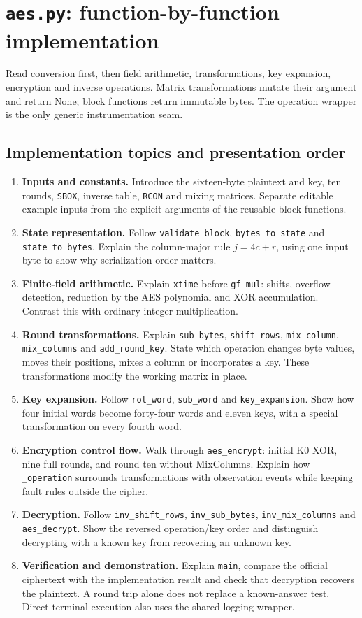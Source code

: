 \section{\texttt{aes.py}: function-by-function implementation}
Read conversion first, then field arithmetic, transformations, key expansion, encryption and inverse operations. Matrix transformations mutate their argument and return None; block functions return immutable bytes. The operation wrapper is the only generic instrumentation seam.

\subsection{Implementation topics and presentation order}
\begin{enumerate}
\item \textbf{Inputs and constants.} Introduce the sixteen-byte plaintext and key, ten rounds, \texttt{SBOX}, inverse table, \texttt{RCON} and mixing matrices. Separate editable example inputs from the explicit arguments of the reusable block functions.
\item \textbf{State representation.} Follow \texttt{validate\_block}, \texttt{bytes\_to\_state} and \texttt{state\_to\_bytes}. Explain the column-major rule $j=4c+r$, using one input byte to show why serialization order matters.
\item \textbf{Finite-field arithmetic.} Explain \texttt{xtime} before \texttt{gf\_mul}: shifts, overflow detection, reduction by the AES polynomial and XOR accumulation. Contrast this with ordinary integer multiplication.
\item \textbf{Round transformations.} Explain \texttt{sub\_bytes}, \texttt{shift\_rows}, \texttt{mix\_column}, \texttt{mix\_columns} and \texttt{add\_round\_key}. State which operation changes byte values, moves their positions, mixes a column or incorporates a key. These transformations modify the working matrix in place.
\item \textbf{Key expansion.} Follow \texttt{rot\_word}, \texttt{sub\_word} and \texttt{key\_expansion}. Show how four initial words become forty-four words and eleven keys, with a special transformation on every fourth word.
\item \textbf{Encryption control flow.} Walk through \texttt{aes\_encrypt}: initial K0 XOR, nine full rounds, and round ten without MixColumns. Explain how \texttt{\_operation} surrounds transformations with observation events while keeping fault rules outside the cipher.
\item \textbf{Decryption.} Follow \texttt{inv\_shift\_rows}, \texttt{inv\_sub\_bytes}, \texttt{inv\_mix\_columns} and \texttt{aes\_decrypt}. Show the reversed operation/key order and distinguish decrypting with a known key from recovering an unknown key.
\item \textbf{Verification and demonstration.} Explain \texttt{main}, compare the official ciphertext with the implementation result and check that decryption recovers the plaintext. A round trip alone does not replace a known-answer test. Direct terminal execution also uses the shared logging wrapper.
\end{enumerate}
